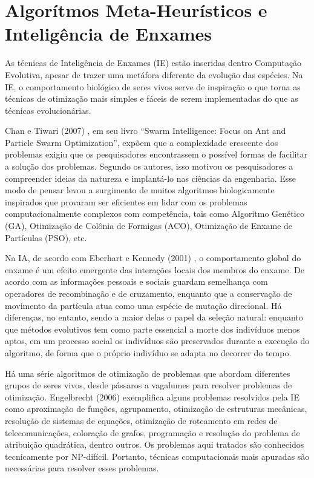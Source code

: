 \chapter{Algorítmos Meta-Heurísticos e Inteligência de Enxames}

As técnicas de Inteligência de Enxames (IE) estão inseridas dentro Computação Evolutiva, apesar de trazer uma metáfora diferente da evolução das espécies. Na IE, o comportamento biológico de seres vivos serve de inspiração o que torna as técnicas de otimização mais simples e fáceis de serem implementadas do que as técnicas evolucionárias.

Chan e Tiwari (2007) \cite{chan2007preface}, em seu livro “Swarm Intelligence: Focus on Ant and Particle Swarm Optimization”, expõem que a complexidade crescente dos problemas exigiu que os pesquisadores encontrassem o possível formas de facilitar a solução dos problemas. Segundo os autores, isso motivou os pesquisadores a compreender ideias da natureza e implantá-lo nas ciências da engenharia. Esse modo de pensar levou a surgimento de muitos algoritmos biologicamente inspirados que provaram ser eficientes em lidar com os problemas computacionalmente complexos com competência, tais como Algoritmo Genético (GA), Otimização de Colônia de Formigas (ACO), Otimização de Enxame de Partículas (PSO), etc.

Na IA, de acordo com Eberhart e Kennedy (2001) \cite{eberhart2001swarm}, o comportamento global do enxame é um efeito emergente das interações locais dos membros do enxame. De acordo com \cite{carmelo} as informações pessoais e sociais guardam semelhança com operadores de recombinação e de cruzamento, enquanto que a conservação de movimento da partícula atua como uma espécie de mutação direcional. Há diferenças, no entanto, sendo a maior delas o papel da seleção natural: enquanto que métodos evolutivos tem como parte essencial a morte dos indivíduos menos aptos, em um processo social os indivíduos são preservados durante a execução do algoritmo, de forma que o próprio indivíduo se adapta no decorrer do tempo.

Há uma série algoritmos de otimização de problemas que abordam diferentes grupos de seres vivos, desde pássaros a vagalumes para resolver problemas de otimização. Engelbrecht (2006) \cite{engelbrecht2006fundamentals} exemplifica alguns problemas resolvidos pela IE como aproximação de funções, agrupamento, otimização de estruturas mecânicas, resolução de sistemas de equações, otimização de roteamento em redes de telecomunicações, coloração de grafos, programação e resolução do problema de atribuição quadrática, dentro outros. Os problemas aqui tratados são conhecidos tecnicamente por NP-difícil. Portanto, técnicas computacionais mais apuradas são necessárias para resolver esses problemas.


